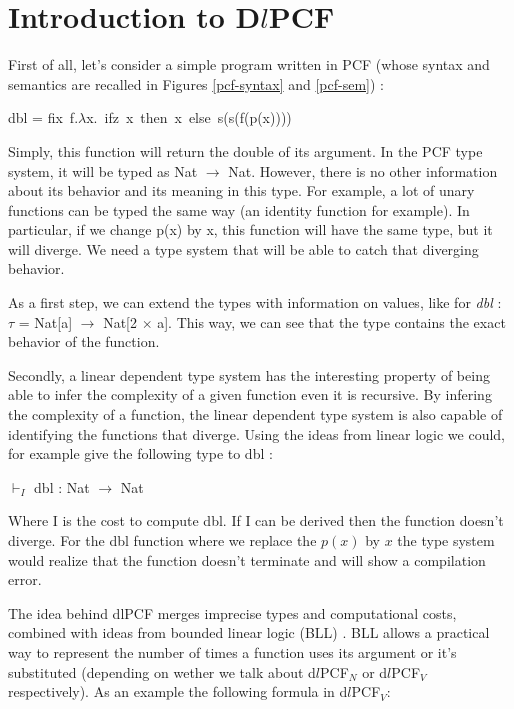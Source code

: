\documentclass[a4paper,12pt]{article}
\begin{document}
\section{Introduction to D$l$PCF}

First of all, let's consider a simple program written in PCF (whose syntax and
semantics are recalled in Figures \ref{pcf-syntax} and \ref{pcf-sem}) :

\begin{center} 
  dbl = fix~f.$\lambda $x.~ifz~x~then~x~else~s(s(f(p(x)))) 
\end{center}

Simply, this function will return the double of its argument. In the PCF type
system, it will be typed as Nat $\rightarrow$ Nat. However, there is no other
information about its behavior and its meaning in this type. For example,
a lot of unary functions can be typed the same way (an identity function for
example). In particular, if we change p(x) by x, this function will have the
same type, but it will diverge. We need a type system that will be able to
catch that diverging behavior.

As a first step, we can extend the types with information on values,
like for \emph{dbl} : $\tau$ = Nat[a] $\rightarrow$ Nat[2 $\times$
a]. This way, we can see that the type contains the exact behavior of
the function. 

\medskip

Secondly, a linear dependent type system has the interesting property of
being able to infer the complexity of a given function even it is
recursive. By infering the complexity of a function, the linear
dependent type system is also capable of identifying the functions that
diverge. Using the ideas from linear logic we could, for
example give the following type to dbl :

\begin{center}
$\vdash_{I}$ dbl : Nat $\rightarrow$ Nat
\end{center}

Where I is the cost to compute dbl. If I can be derived then 
 the function doesn't diverge. For the dbl function where
we replace the $p(x)$ by $x$ the type system would realize that the function
doesn't terminate and will show a compilation error.

The idea behind dlPCF merges imprecise types and computational
costs, combined with ideas from bounded linear logic (BLL)
\cite{girard1992bounded}. BLL allows a practical way to
represent the number of times a function uses its argument or it's
substituted (depending on wether we talk about d$l$PCF$_{N}$ or 
d$l$PCF$_{V}$ respectively). As an example the following formula 
in  d$l$PCF$_{V}$:
\end{document}
